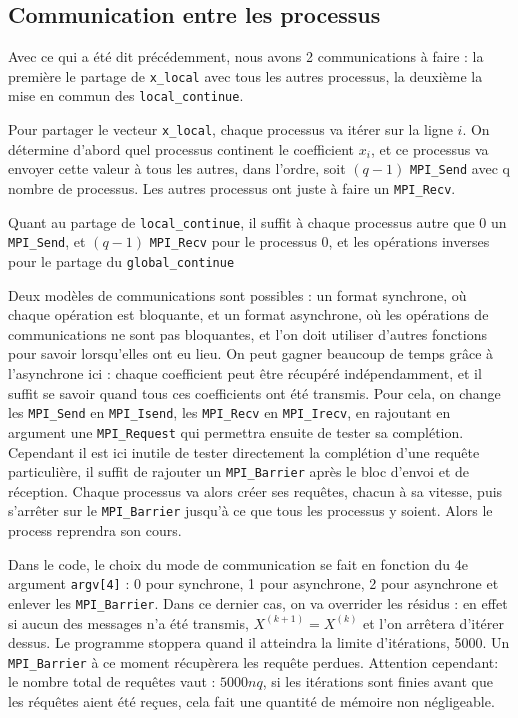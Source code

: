 \documentclass[11pt, a4paper]{article}
\begin{document}
\newpage
\subsection{Communication entre les processus}

Avec ce qui a été dit précédemment, nous avons 2 communications à faire :
la première le partage de \lstinline{x_local} avec tous les autres processus,
la deuxième la mise en commun des \lstinline{local_continue}.

\bigskip

Pour partager le vecteur \lstinline{x_local}, chaque processus va itérer sur la ligne \(i\).
On détermine d'abord quel processus continent le coefficient \(x_i\),
et ce processus va envoyer cette valeur à tous les autres, dans l'ordre,
soit \((q-1)\) \lstinline{MPI_Send} avec q nombre de processus.
Les autres processus ont juste à faire un \lstinline{MPI_Recv}.

Quant au partage de \lstinline{local_continue},
il suffit à chaque processus autre que 0 un \lstinline{MPI_Send}, et
\((q-1)\) \lstinline{MPI_Recv} pour le processus 0, et les opérations inverses
pour le partage du \lstinline{global_continue}

\bigskip

Deux modèles de communications sont possibles : un format synchrone,
où chaque opération est bloquante, et un format asynchrone, où les opérations
de communications ne sont pas bloquantes, et l'on doit utiliser d'autres fonctions
pour savoir lorsqu'elles ont eu lieu.
On peut gagner beaucoup de temps grâce à l'asynchrone ici :
chaque coefficient peut être récupéré indépendamment, et il suffit se savoir
quand tous ces coefficients ont été transmis.
Pour cela, on change les \lstinline{MPI_Send} en \lstinline{MPI_Isend},
les \lstinline{MPI_Recv} en \lstinline{MPI_Irecv}, en rajoutant en argument
une \lstinline{MPI_Request} qui permettra ensuite de tester sa complétion.
Cependant il est ici inutile de tester directement la complétion d'une requête particulière,
il suffit de rajouter un \lstinline{MPI_Barrier} après le bloc d'envoi et de réception.
Chaque processus va alors créer ses requêtes, chacun à sa vitesse, puis s'arrêter sur le \lstinline{MPI_Barrier} jusqu'à ce que tous les processus y soient.
Alors le process reprendra son cours.

Dans le code, le choix du mode de communication se fait en fonction du 4e argument \lstinline{argv[4]} : 0 pour synchrone, 1 pour asynchrone, 2 pour asynchrone et enlever les \lstinline{MPI_Barrier}.
Dans ce dernier cas, on va overrider les résidus : en effet si aucun des messages n'a été transmis, \(X^{(k+1)} = X^{(k)} \) et l'on arrêtera d'itérer dessus.
Le programme stoppera quand il atteindra la limite d'itérations, 5000.
Un \lstinline{MPI_Barrier} à ce moment récupèrera les requête perdues.
Attention cependant: le nombre total de requêtes vaut : \( 5000nq \), si les itérations sont finies avant que les réquêtes aient été reçues, cela fait une quantité de mémoire non négligeable.
\newpage
\end{document}
